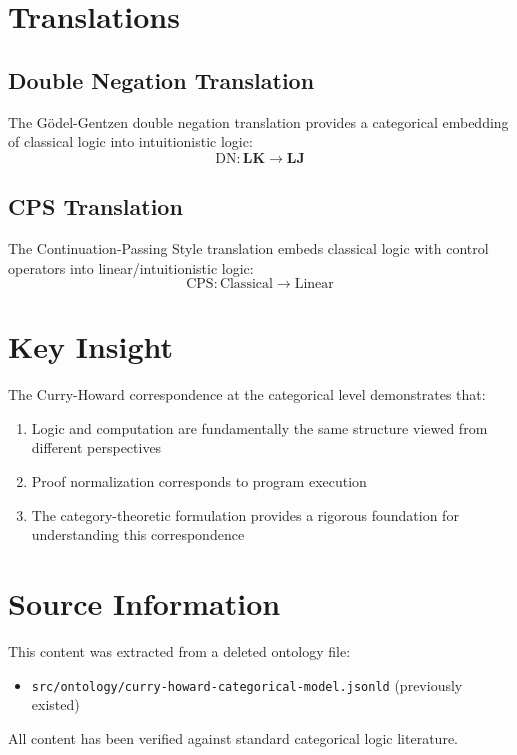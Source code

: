 \section*{Translations}

\subsection*{Double Negation Translation}

The Gödel-Gentzen double negation translation provides a categorical embedding of classical logic into intuitionistic logic:
$$\text{DN}: \mathbf{LK} \to \mathbf{LJ}$$

\subsection*{CPS Translation}

The Continuation-Passing Style translation embeds classical logic with control operators into linear/intuitionistic logic:
$$\text{CPS}: \text{Classical} \to \text{Linear}$$

\section*{Key Insight}

The Curry-Howard correspondence at the categorical level demonstrates that:
\begin{enumerate}
    \item Logic and computation are fundamentally the same structure viewed from different perspectives
    \item Proof normalization corresponds to program execution
    \item The category-theoretic formulation provides a rigorous foundation for understanding this correspondence
\end{enumerate}

\section*{Source Information}

This content was extracted from a deleted ontology file:
\begin{itemize}
    \item \texttt{src/ontology/curry-howard-categorical-model.jsonld} (previously existed)
\end{itemize}

All content has been verified against standard categorical logic literature.
